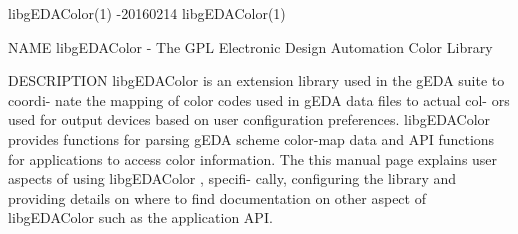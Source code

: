 libgEDAColor(1)                    -20160214                   libgEDAColor(1)



NAME
       libgEDAColor - The GPL Electronic Design Automation Color Library

DESCRIPTION
       libgEDAColor  is an extension library used in the gEDA suite to coordi-
       nate the mapping of color codes used in gEDA data files to actual  col-
       ors  used  for  output devices based on user configuration preferences.
       libgEDAColor provides functions for parsing gEDA scheme color-map  data
       and  API  functions  for  applications to access color information. The
       this manual page explains user aspects of using libgEDAColor , specifi-
       cally,  configuring  the library and providing details on where to find
       documentation on other aspect of libgEDAColor such as  the  application
       API.

